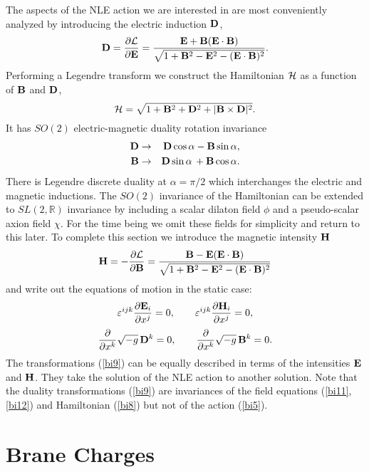 \documentclass[a4paper,12pt]{article}
\begin{document}
The aspects of the NLE action we are interested in are most conveniently 
analyzed by introducing the electric induction ${\bf D}$,
\begin{equation}
{\bf D}=\frac{\partial {\cal L}}{\partial {\bf E}}=\frac{{\bf E}+{\bf B} ({\bf E}\cdot{\bf B})}{\sqrt{1+
{{\bf B}}^2-{{\bf E}}^2-({\bf E}\cdot {\bf B})^2}}.
\label{bi7}
\end{equation}
Performing a Legendre transform we construct the Hamiltonian ${\cal H}$ 
as a function of ${\bf B}$ and ${\bf D}$,
\begin{equation}
{\cal H}=\sqrt{1+{{\bf B}}^2+{{\bf D}}^2+|{\bf B}\times{\bf D}|^2}.
\label{bi8}
\end{equation}
It has $SO(2)$ electric-magnetic duality rotation invariance
\begin{eqnarray}
{\bf D} & \rightarrow & {\bf D}\cos\alpha -{\bf B}\sin\alpha,\nonumber\\
{\bf B} & \rightarrow & {\bf D}\sin\alpha\, +{\bf B}\cos\alpha.
\label{bi9}
\end{eqnarray}
There is Legendre discrete duality at $\alpha =\pi /2$ which interchanges 
the electric and magnetic inductions.
The $SO(2)$ invariance of the Hamiltonian can be extended to 
$SL(2,\mathbb{R})$ invariance by including  a scalar dilaton field $\phi$ and 
a pseudo-scalar axion field $\chi$. For the time being we omit these fields 
for simplicity and return to this later. To complete this section we 
introduce the magnetic intensity ${\bf H}$ 
\begin{equation}
{\bf H}=-\frac{\partial {\cal L}}{\partial {\bf B}}=\frac{{\bf B} -{\bf E} ({\bf E}\cdot{\bf B} )}
{\sqrt{1+{{\bf B}}^2-{{\bf E}}^2-({\bf E}\cdot{\bf B})^2}}
\label{bi10}
\end{equation}
and write out the equations of motion in the static case:
\begin{equation}
{\varepsilon}^{ijk}\frac{\partial {{\bf E}}_i}{\partial x^j}=0,\qquad 
{\varepsilon}^{ijk}\frac{\partial {{\bf H}}_i}{\partial x^j}=0,
\label{bi11}
\end{equation}
\begin{equation}
\frac{\partial }{\partial x^k}\sqrt{-g}\,{{\bf D}}^k=0,\qquad 
\frac{\partial }{\partial x^k}\sqrt{-g}\,{{\bf B}}^k=0.
\label{bi12}
\end{equation}
The transformations (\ref{bi9}) can be equally described in terms of the 
intensities ${\bf E}$ and ${\bf H}$. They take the solution of the NLE action to
another solution. Note that the duality transformations (\ref{bi9}) are 
invariances of the field equations (\ref{bi11},\ref{bi12}) and Hamiltonian 
(\ref{bi8}) but not of the action (\ref{bi5}).

\section{Brane Charges}
\end{document}
